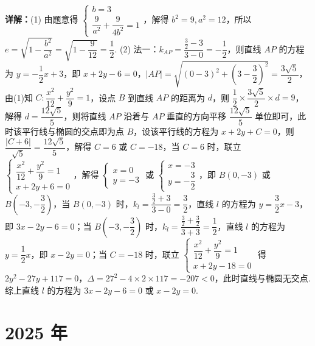 \begin{question}[points=15]
\begin{solution}
\textbf{详解：}(1) 由题意得 $\begin{cases} b=3 \\ \dfrac{9}{a^2}+\dfrac{9}{4b^2}=1 \end{cases}$，解得 $b^2=9, a^2=12$，所以 $e=\sqrt{1-\dfrac{b^2}{a^2}}=\sqrt{1-\dfrac{9}{12}}=\dfrac{1}{2}$.
(2) 法一：$k_{AP}=\dfrac{\frac{3}{2}-3}{3-0}=-\dfrac{1}{2}$，则直线 $AP$ 的方程为 $y=-\dfrac{1}{2}x+3$，即 $x+2y-6=0$，$|AP|=\sqrt{(0-3)^2+\left(3-\dfrac{3}{2}\right)^2}=\dfrac{3\sqrt{5}}{2}$，由(1)知 $C:\dfrac{x^2}{12}+\dfrac{y^2}{9}=1$，设点 $B$ 到直线 $AP$ 的距离为 $d$，则 $\dfrac{1}{2}\times\dfrac{3\sqrt{5}}{2}\times d=9$，解得 $d=\dfrac{12\sqrt{5}}{5}$，则将直线 $AP$ 沿着与 $AP$ 垂直的方向平移 $\dfrac{12\sqrt{5}}{5}$ 单位即可，此时该平行线与椭圆的交点即为点 $B$，设该平行线的方程为 $x+2y+C=0$，则 $\dfrac{|C+6|}{\sqrt{5}}=\dfrac{12\sqrt{5}}{5}$，解得 $C=6$ 或 $C=-18$，当 $C=6$ 时，联立 $\begin{cases} \dfrac{x^2}{12}+\dfrac{y^2}{9}=1 \\ x+2y+6=0 \end{cases}$，解得 $\begin{cases} x=0 \\ y=-3 \end{cases}$ 或 $\begin{cases} x=-3 \\ y=-\dfrac{3}{2} \end{cases}$，即 $B(0,-3)$ 或 $B\left(-3,-\dfrac{3}{2}\right)$，当 $B(0,-3)$ 时，$k_l=\dfrac{\frac{3}{2}+3}{3-0}=\dfrac{3}{2}$，直线 $l$ 的方程为 $y=\dfrac{3}{2}x-3$，即 $3x-2y-6=0$；当 $B\left(-3,-\dfrac{3}{2}\right)$ 时，$k_l=\dfrac{\frac{3}{2}+\frac{3}{2}}{3+3}=\dfrac{1}{2}$，直线 $l$ 的方程为 $y=\dfrac{1}{2}x$，即 $x-2y=0$；当 $C=-18$ 时，联立 $\begin{cases} \dfrac{x^2}{12}+\dfrac{y^2}{9}=1 \\ x+2y-18=0 \end{cases}$ 得 $2y^2-27y+117=0$，$\Delta=27^2-4\times2\times117=-207<0$，此时直线与椭圆无交点. 综上直线 $l$ 的方程为 $3x-2y-6=0$ 或 $x-2y=0$.
\end{solution}
\end{question}

\section*{2025 年}

